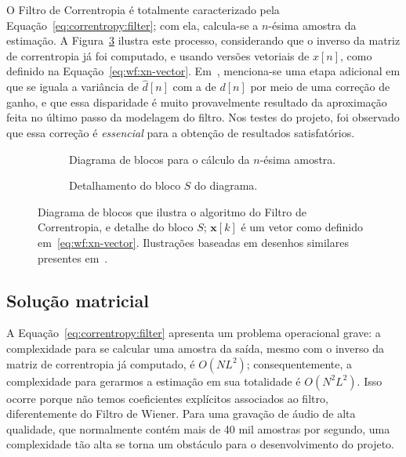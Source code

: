 O Filtro de Correntropia é totalmente caracterizado pela
Equação~\eqref{eq:correntropy:filter}; com ela, calcula-se a $n$-ésima amostra da
estimação. A Figura~\ref{fig:correntropy:filter} ilustra este processo, considerando
que o inverso da matriz de correntropia já foi computado, e usando versões vetoriais de
$x[n]$, como definido na Equação~\eqref{eq:wf:xn-vector}. Em~\cite{pokharel-2006,
	pokharel-2007}, menciona-se uma etapa adicional em que se iguala a variância de
$\hat{d}[n]$ com a de $d[n]$ por meio de uma correção de ganho, e que essa disparidade
é muito provavelmente resultado da aproximação feita no último passo da modelagem do
filtro. Nos testes do projeto, foi observado que essa correção é \emph{essencial} para
a obtenção de resultados satisfatórios.
\begin{figure}[!ht]
	\centering
	\begin{subfigure}[t]{\textwidth}
		\centering
		
		\caption{Diagrama de blocos para o cálculo da $n$-ésima amostra.}
		\label{fig:correntropy:block-diagram}
	\end{subfigure}

	\bigskip\medskip

	\begin{subfigure}[t]{\textwidth}
		\centering
		
		\caption{Detalhamento do bloco $S$ do diagrama.}
		\label{fig:correntropy:sigma-specification}
	\end{subfigure}

	\caption[Diagrama de blocos do Filtro de Correntropia]{Diagrama de blocos que ilustra o algoritmo do Filtro de Correntropia, e detalhe do bloco $S$; $\mathbf{x}[k]$ é um vetor como definido em~\eqref{eq:wf:xn-vector}. Ilustrações baseadas em desenhos similares presentes em~\cite{pokharel-2007}.}
	\label{fig:correntropy:filter}
\end{figure}

\subsection{Solução matricial}

A Equação~\eqref{eq:correntropy:filter} apresenta um problema operacional grave: a
complexidade para se calcular uma amostra da saída, mesmo com o inverso da matriz de
correntropia já computado, é $O(N L^2)$; consequentemente, a complexidade para gerarmos
a estimação em sua totalidade é $O(N^2 L^2)$. Isso ocorre porque não temos coeficientes
explícitos associados ao filtro, diferentemente do Filtro de Wiener. Para uma gravação
de áudio de alta qualidade, que normalmente contém mais de 40 mil amostras por segundo,
uma complexidade tão alta se torna um obstáculo para o desenvolvimento do projeto.

